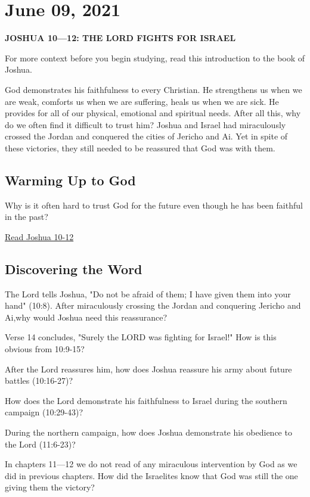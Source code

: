 \documentclass[11pt]{article}
\begin{document}
\section{June 09, 2021}
\label{sec:orgea510b8}

\textbf{\textbf{JOSHUA 10—12: THE LORD FIGHTS FOR ISRAEL}}

For more context before you begin studying, read this introduction to
the book of Joshua.

God demonstrates his faithfulness to every Christian. He strengthens
us when we are weak, comforts us when we are suffering, heals us when
we are sick. He provides for all of our physical, emotional and
spiritual needs. After all this, why do we often find it difficult to
trust him? Joshua and Israel had miraculously crossed the Jordan and
conquered the cities of Jericho and Ai. Yet in spite of these
victories, they still needed to be reassured that God was with them.

\subsection{Warming Up to God}
\label{sec:org7cb4256}

Why is it often hard to trust God for the future even though he has
been faithful in the past?

\href{https://www.biblegateway.com/passage/?search=Joshua\%2010-12\&version=NIV\&interface=print}{Read Joshua 10-12}

\subsection{Discovering the Word}
\label{sec:org4acc67f}

The Lord tells Joshua, "Do not be afraid of them; I have given them
into your hand" (10:8). After miraculously crossing the Jordan and
conquering Jericho and Ai,why would Joshua need this reassurance?

Verse 14 concludes, "Surely the LORD was fighting for Israel!" How is
this obvious from 10:9-15?

After the Lord reassures him, how does Joshua reassure his army about
future battles (10:16-27)?

How does the Lord demonstrate his faithfulness to Israel during the
southern campaign (10:29-43)?

During the northern campaign, how does Joshua demonstrate his
obedience to the Lord (11:6-23)?

In chapters 11—12 we do not read of any miraculous intervention by God
as we did in previous chapters. How did the Israelites know that God
was still the one giving them the victory?
\end{document}
